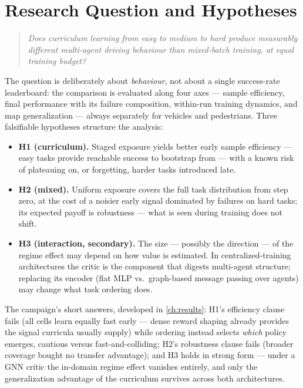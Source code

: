 \section{Research Question and Hypotheses}
\label{sec:rq}

\begin{quote}
  \emph{Does curriculum learning from easy to medium to hard produce
  measurably different multi-agent driving behaviour than mixed-batch
  training, at equal training budget?}
\end{quote}

The question is deliberately about \emph{behaviour}, not about a single
success-rate leaderboard: the comparison is evaluated along four axes
--- sample efficiency, final performance with its failure composition,
within-run training dynamics, and map generalization --- always
separately for vehicles and pedestrians. Three falsifiable hypotheses
structure the analysis:

\begin{itemize}
  \item \textbf{H1 (curriculum).} Staged exposure yields better early
        sample efficiency --- easy tasks provide reachable success to
        bootstrap from --- with a known risk of plateauing on, or
        forgetting, harder tasks introduced late.
  \item \textbf{H2 (mixed).} Uniform exposure covers the full task
        distribution from step zero, at the cost of a noisier early
        signal dominated by failures on hard tasks; its expected payoff
        is robustness --- what is seen during training does not shift.
  \item \textbf{H3 (interaction, secondary).} The size --- possibly the
        direction --- of the regime effect may depend on how value is
        estimated. In centralized-training architectures the critic is
        the component that digests multi-agent structure; replacing its
        encoder (flat MLP vs.\ graph-based message passing over agents)
        may change what task ordering does.
\end{itemize}

The campaign's short answers, developed in \cref{ch:results}: H1's
efficiency clause fails (all cells learn equally fast early --- dense
reward shaping already provides the signal curricula usually supply)
while ordering instead selects \emph{which} policy emerges, cautious
versus fast-and-colliding; H2's robustness clause fails (broader
coverage bought no transfer advantage); and H3 holds in strong form ---
under a GNN critic the in-domain regime effect vanishes entirely, and
only the generalization advantage of the curriculum survives across both
architectures.

